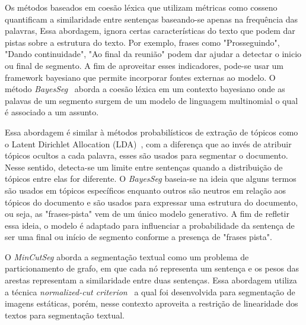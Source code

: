 











Os métodos baseados em coesão léxica que utilizam métricas como cosseno quantificam a similaridade entre sentenças baseando-se apenas na frequência das palavras, Essa abordagem, ignora certas características do texto que podem dar pistas sobre a estrutura do texto. Por exemplo, frases como "Prosseguindo", "Dando continuidade", "Ao final da reunião" podem dar ajudar a detectar o inicio ou final de segmento. A fim de aproveitar esses indicadores, pode-se usar um framework bayesiano que permite incorporar fontes externas ao modelo. O método \textit{BayesSeg}~\cite{Eisenstein2008} aborda a coesão léxica em um contexto bayesiano onde as palavas de um segmento surgem de um modelo de linguagem multinomial o qual é associado a um assunto. 

Essa abordagem é similar à métodos probabilísticos de extração de tópicos como o Latent Dirichlet Allocation (LDA)~\cite{Blei2003}, com a diferença que ao invés de atribuir tópicos ocultos a cada palavra, esses são usados para segmentar o documento. Nesse sentido, detecta-se um limite entre sentenças quando a distribuição de tópicos entre elas for diferente.  O \textit{BayesSeg} baseia-se na ideia que alguns termos são usados em tópicos específicos enquanto outros são neutros em relação aos tópicos do documento e são usados para expressar uma estrutura do documento, ou seja, as "frases-pista" vem de um único modelo generativo. A fim de refletir essa ideia, o modelo é adaptado para influenciar a probabilidade da sentença de ser uma final ou início de segmento conforme a presença de "frases pista".






O \textit{MinCutSeg} aborda a segmentação textual como um problema de particionamento de grafo, em que cada nó representa um sentença e os pesos das arestas representam a similaridade entre duas sentenças. Essa abordagem utiliza a técnica \textit{normalized-cut criterion}~\cite{Shi2000} a qual foi desenvolvida para segmentação de imagens estáticas, porém, nesse contexto aproveita a restrição de linearidade dos textos para segmentação textual.



















 
